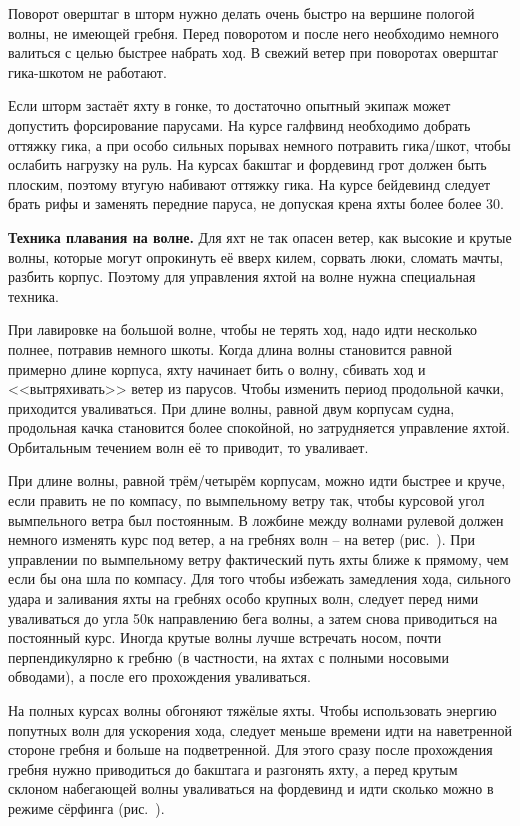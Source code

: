 Поворот оверштаг в шторм нужно делать очень быстро на вершине пологой волны, не имеющей гребня. Перед поворотом и после него необходимо немного валиться с целью быстрее набрать ход. В свежий ветер при поворотах оверштаг гика-шкотом не работают.

Если шторм застаёт яхту в гонке, то достаточно опытный экипаж может допустить форсирование парусами. На курсе галфвинд необходимо добрать оттяжку гика, а при особо сильных порывах немного потравить гика\-/шкот, чтобы ослабить нагрузку на руль. На курсах бакштаг и фордевинд грот должен быть плоским, поэтому втугую набивают оттяжку гика. На курсе бейдевинд следует брать рифы и заменять передние паруса, не допуская крена яхты более более 30\gr.
 
\textbf{Техника плавания на волне.} Для яхт не так опасен ветер, как высокие и крутые волны, которые могут опрокинуть её вверх килем, сорвать люки, сломать мачты, разбить корпус. Поэтому для управления яхтой на волне нужна специальная техника.

При лавировке на большой волне, чтобы не терять ход, надо идти несколько полнее, потравив немного шкоты. Когда длина волны становится равной примерно длине корпуса, яхту начинает бить о волну, сбивать ход и <<вытряхивать>> ветер из парусов. Чтобы изменить период продольной качки, приходится уваливаться. При длине волны, равной двум корпусам судна, продольная качка становится более спокойной, но затрудняется управление яхтой. Орбитальным течением волн её то приводит, то уваливает.

При длине волны, равной трём\-/четырём корпусам, можно идти быстрее и круче, если править не по компасу, по вымпельному ветру так, чтобы курсовой угол вымпельного ветра был постоянным. В ложбине между волнами рулевой должен немного изменять курс под ветер, а на гребнях волн \--- на ветер (рис.~). При управлении по вымпельному ветру фактический путь яхты ближе к прямому, чем если бы она шла по компасу. Для того чтобы избежать замедления хода, сильного удара и заливания яхты на гребнях особо крупных волн, следует перед ними уваливаться до угла 50\gr к направлению бега волны, а затем снова приводиться на постоянный курс. Иногда крутые волны лучше встречать носом, почти перпендикулярно к гребню (в частности, на яхтах с полными носовыми обводами), а после его прохождения уваливаться.

На полных курсах волны обгоняют тяжёлые яхты. Чтобы использовать энергию попутных волн для ускорения хода, следует меньше времени идти на наветренной стороне гребня и больше на подветренной. Для этого сразу после прохождения гребня нужно приводиться до бакштага и разгонять яхту, а перед крутым склоном набегающей волны уваливаться на фордевинд и идти сколько можно в режиме сёрфинга (рис.~).

